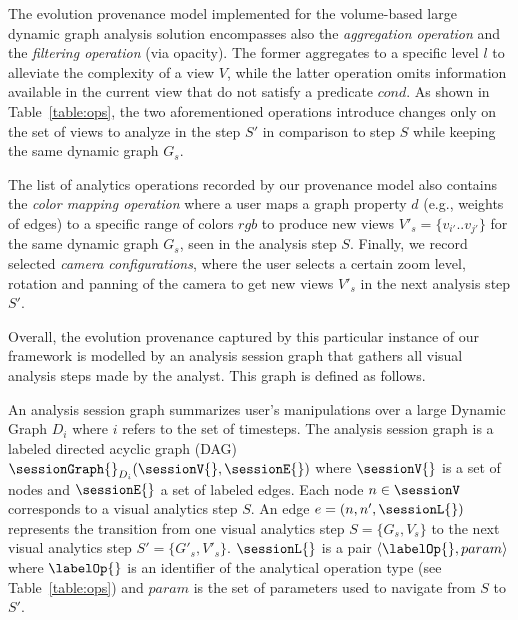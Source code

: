 The evolution provenance model implemented for the volume-based large dynamic graph analysis solution encompasses also the \emph{aggregation operation} and the \emph{filtering operation} (via opacity). 
The former aggregates to a specific level $l$ to alleviate the complexity of a view $V$, while the latter operation omits information available in the current view that do not satisfy a predicate $cond$. As shown in Table~\ref{table:ops}, the two aforementioned operations introduce changes only on the set of views to analyze in the step $S'$ in comparison to step $S$ while keeping the same dynamic graph $G_s$.

The list of analytics operations recorded by our provenance model also contains the \emph{color mapping operation} where a user maps a graph property $d$ (e.g., weights of edges) to a specific range of colors $rgb$ to produce new views $V'_{s}=\{v_{i'}..v_{j'}\}$ for the same dynamic graph $G_s$, seen in the analysis step $S$. 
Finally, we record selected \emph{camera configurations}, where the user selects a certain zoom level, rotation and panning of the camera to get new views $V'_s$ in the next analysis step $S'$.

Overall, the evolution provenance captured by this particular instance of our framework \framework{} is modelled by an analysis session graph that gathers all visual analysis steps made by the analyst. 
This graph is defined as follows.


\begin{definition}
An analysis session graph summarizes user's manipulations over a large Dynamic Graph $D_i$ where $i$ refers to the set of timesteps.
The analysis session graph is a labeled directed acyclic graph (DAG) $\sessionGraph{}_{D_i}(\sessionV{}, \sessionE{})$ where $\sessionV{}$ is a set of nodes and $\sessionE{}$ a set of labeled edges. 
Each node $n \in \sessionV$ corresponds to a visual analytics step $S$.
An edge $e = (n, n', \sessionL{})$ represents the transition from one visual analytics step $S = \{{G_s}, V_s\}$ to the next visual analytics step $S' = \{{G'_s}, V'_s\}$. $\sessionL{}$ is a pair $\langle \labelOp{}, param \rangle$ where $\labelOp{}$ is an identifier of the analytical operation type (see Table~\ref{table:ops}) and $param$ is the set of parameters used to navigate from $S$ to $S'$.
\label{def:sessionA02}
\end{definition}


